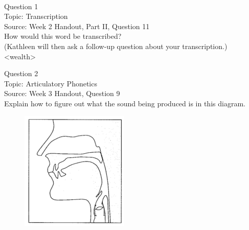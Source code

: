 \documentclass[12pt]{article}
\begin{document}
\newpage

\begin{center}
\textbf{{\color{red}{\HUGE END OF EXAM}}}\\

\end{center}
\newpage

\begin{center}
\textbf{{\color{blue}{\HUGE START OF EXAM\\}}}

\textbf{{\color{blue}{\HUGE Student ID: 36273\\}}}

\textbf{{\color{blue}{\HUGE \\}}}

\end{center}
\newpage

{\large Question 1}\\

Topic: Transcription\\
Source: Week 2 Handout, Part II, Question 11\\

How would this word be transcribed?\\ (Kathleen will then ask a follow-up question about your transcription.)\\

<wealth>


\newpage

{\large Question 2}\\

Topic: Articulatory Phonetics\\
Source: Week 3 Handout, Question 9\\

Explain how to figure out what the sound being produced is in this diagram.\\

\begin{figure}[H]
\includegraphics{../images/sagittal_p.png}
\end{figure}
\end{document}
